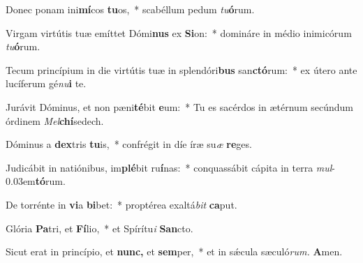\item Donec ponam ini\textbf{mí}cos \textbf{tu}os,~* scabéllum pedum \textit{tu}\textbf{ó}rum.
\item Virgam virtútis tuæ emíttet Dómi\textbf{nus} ex \textbf{Si}on:~* domináre in médio inimicórum \textit{tu}\textbf{ó}rum.
\item Tecum princípium in die virtútis tuæ in splendóri\textbf{bus} san\textbf{ctó}rum:~* ex útero ante lucíferum gé\textit{nu}\textbf{i} te.
\item Jurávit Dóminus, et non pæni\textbf{té}bit \textbf{e}um:~* Tu es sacérdos in ætérnum secúndum órdinem \textit{Mel}\textbf{chí}sedech.
\item Dóminus a \textbf{dex}tris \textbf{tu}is,~* confrégit in díe íræ su\tinyhspace\textit{æ} \textbf{re}ges.
\item Judicábit in natiónibus, im\textbf{plé}bit ru\textbf{í}nas:~* conquassábit cápita in terra \textit{mul}\kern -0.03em\textbf{tó}rum.
\item De torrénte in \textbf{vi}a \textbf{bi}bet:~* proptérea exaltá\textit{bit} \textbf{ca}put.
\item Glória \textbf{Pa}tri, et \textbf{Fí}lio,~* et Spírítu\textit{i} \textbf{San}cto.
\item Sicut erat in princípio, et \textbf{nunc,} et \textbf{sem}per,~* et in sǽcula sæculó\textit{rum.} \textbf{A}men.